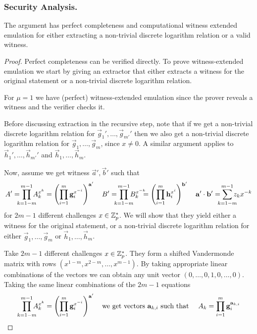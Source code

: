 \subsubsection{Security Analysis.}
\begin{theorem}\label{th:log}
The argument has perfect completeness and computational witness extended emulation for either extracting a non-trivial discrete logarithm relation or a valid witness.
\end{theorem}
\begin{proof}
Perfect completeness can be verified directly. 
To prove witness-extended emulation we start by giving an extractor that either extracts a witness for the original statement or a non-trivial discrete logarithm relation. 

For $\mu=1$ we have (perfect) witness-extended emulation since the prover reveals a witness and the verifier checks it. 

Before discussing extraction in the recursive step, note that if we get a non-trivial discrete logarithm relation for $\vec{g}_1',\ldots,\vec{g}_{m'}'$ then we also get a non-trivial discrete logarithm relation for $\vec{g}_1,\ldots,\vec{g}_m$, since $x\neq 0$. A similar argument applies to 
 $\vec{h}_1',\ldots,\vec{h}_{m'}'$ %
 and  $\vec{h}_1,\ldots,\vec{h}_m$.

Now, assume we get witness $\vec{a}',\vec{b}'$  such that
$$A'=\mkern-12mu\prod_{k=1-m}^{m-1}\mkern-12mu A_k^{x^{k}}=\left(\prod_{i=1}^m\vec{g}_i^{x^{-i}}\right)^{\vec{a}'}\quad  B'=\mkern-12mu\prod_{k=1-m}^{m-1}\mkern-12mu{}B_k^{x^{-k}}\mkern-12mu=\left(\prod_{i=1}^m\vec{h}_i^{x^{i}}\right)^{\vec{b}'}%
\quad
\vec{a}'\cdot \vec{b}'=\mkern-12mu\sum_{k=1-m}^{m-1}\mkern-12mu{}z_kx^{-k}$$
 for $2m-1$ different challenges $x\in \Z_p^*$. We will show that they yield either a witness for the original statement, or a non-trivial discrete logarithm relation for either $\vec{g}_1,\ldots,\vec{g}_m$ or $\vec{h}_1,\ldots,\vec{h}_m$.

Take $2m-1$ different challenges $x\in \Z_p^*$. They form a shifted Vandermonde matrix with rows $(x^{1-m},x^{2-m},\ldots,x^{m-1})$. By taking appropriate linear combinations of the vectors we can obtain any unit vector $(0,\ldots,0,1,0,\ldots,0)$. Taking the same linear combinations of the $2m-1$ equations $$\prod_{k=1-m}^{m-1}\mkern-12muA_k^{x^{k}}=\left(\prod_{i=1}^m\vec{g}_i^{x^{-i}}\right)^{\vec{a}'} \mbox{\quad we get vectors }\vec{a}_{k,i}\mbox{ such that \quad}A_k=\prod_{i=1}^m\vec{g}_i^{\vec{a}_{k,i}}$$ 


\end{proof}
